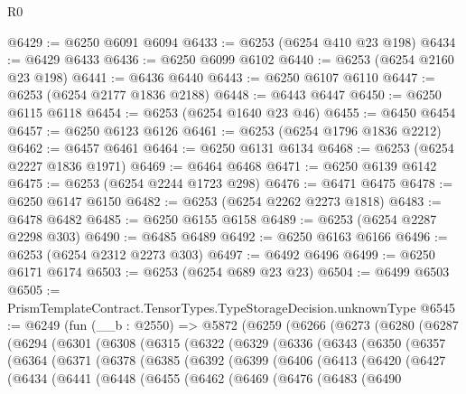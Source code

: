 \begin{lexlean}{R0}
\begin{coremodule}
@6429 := @6250 @6091 @6094
@6433 := @6253 (@6254 @410 @23 @198)
@6434 := @6429 @6433
@6436 := @6250 @6099 @6102
@6440 := @6253 (@6254 @2160 @23 @198)
@6441 := @6436 @6440
@6443 := @6250 @6107 @6110
@6447 := @6253 (@6254 @2177 @1836 @2188)
@6448 := @6443 @6447
@6450 := @6250 @6115 @6118
@6454 := @6253 (@6254 @1640 @23 @46)
@6455 := @6450 @6454
@6457 := @6250 @6123 @6126
@6461 := @6253 (@6254 @1796 @1836 @2212)
@6462 := @6457 @6461
@6464 := @6250 @6131 @6134
@6468 := @6253 (@6254 @2227 @1836 @1971)
@6469 := @6464 @6468
@6471 := @6250 @6139 @6142
@6475 := @6253 (@6254 @2244 @1723 @298)
@6476 := @6471 @6475
@6478 := @6250 @6147 @6150
@6482 := @6253 (@6254 @2262 @2273 @1818)
@6483 := @6478 @6482
@6485 := @6250 @6155 @6158
@6489 := @6253 (@6254 @2287 @2298 @303)
@6490 := @6485 @6489
@6492 := @6250 @6163 @6166
@6496 := @6253 (@6254 @2312 @2273 @303)
@6497 := @6492 @6496
@6499 := @6250 @6171 @6174
@6503 := @6253 (@6254 @689 @23 @23)
@6504 := @6499 @6503
@6505 := PrismTemplateContract.TensorTypes.TypeStorageDecision.unknownType
@6545 := @6249
    (fun (__b : @2550) =>
    @5872
      (@6259
        (@6266
          (@6273
            (@6280
              (@6287
                (@6294
                  (@6301
                    (@6308
                      (@6315
                        (@6322
                          (@6329
                            (@6336
                              (@6343
                                (@6350
                                  (@6357
                                    (@6364
                                      (@6371
                                        (@6378
                                          (@6385
                                            (@6392
                                              (@6399
                                                (@6406
                                                  (@6413
                                                    (@6420
                                                      (@6427
                                                        (@6434
                                                          (@6441
                                                            (@6448
                                                              (@6455
                                                                (@6462
                                                                  (@6469
                                                                    (@6476
                                                                      (@6483
                                                                        (@6490

\end{coremodule}
\end{lexlean}
